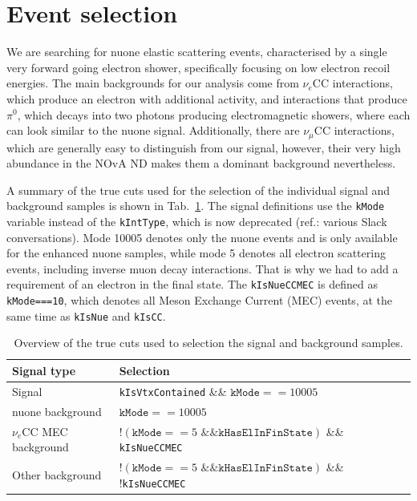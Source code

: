 \section{Event selection}\label{sec:EventSelection}
We are searching for \gls{nuone} elastic scattering events, characterised by a single very forward going electron shower, specifically focusing on low electron recoil energies. The main backgrounds for our analysis come from $\nu_e$\gls{CC} interactions, which produce an electron with additional activity, and interactions that produce $\pi^0$, which decays into two photons producing electromagnetic showers, where each can look similar to the \gls{nuone} signal. Additionally, there are $\nu_\mu$\gls{CC} interactions, which are generally easy to distinguish from our signal, however, their very high abundance in the \gls{NOvA} \gls{ND} makes them a dominant background nevertheless.


A summary of the true cuts used for the selection of the individual signal and background samples is shown in Tab.~\ref{tab:NuMMSamplesSelection}. The signal definitions use the \texttt{kMode} variable instead of the \texttt{kIntType}, which is now deprecated (ref.: various Slack conversations). Mode 10005 denotes only the \gls{nuone} events and is only available for the enhanced \gls{nuone} samples, while mode 5 denotes all electron scattering events, including inverse muon decay interactions. That is why we had to add a requirement of an electron in the final state. The \texttt{kIsNueCCMEC} is defined as \texttt{kMode===10}, which denotes all Meson Exchange Current (MEC) events, at the same time as \texttt{kIsNue} and \texttt{kIsCC}.

\begin{table}[!ht]
\centering
\caption{Overview of the true cuts used to selection the signal and background samples.}
\def\arraystretch{1.4}
\begin{tabular}{l@{\hskip 1cm}l@{\hskip 1cm}l@{\hskip 1cm}l}
Signal type            & Selection\\\hline
Signal                 & \texttt{kIsVtxContained} \&\& $\texttt{kMode}==10005$\\
\gls{nuone} background & $\texttt{kMode}==10005$\\
$\nu_e$\gls{CC} \gls{MEC} background & $!\left(\texttt{kMode}==5\text{ \&\& }\texttt{kHasElInFinState}\right)$  \&\& \texttt{kIsNueCCMEC}\\
Other background       & $!\left(\texttt{kMode}==5\text{ \&\& }\texttt{kHasElInFinState}\right)$  \&\& !\texttt{kIsNueCCMEC}
\end{tabular}
\label{tab:NuMMSamplesSelection}
\end{table}


